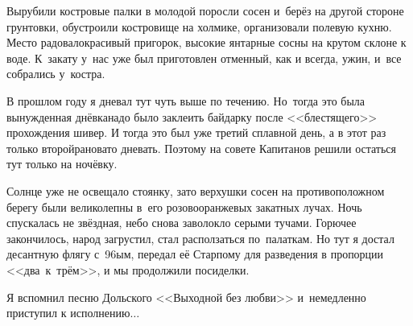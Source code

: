 Вырубили костровые палки в молодой поросли сосен и~берёз на другой стороне грунтовки, обустроили костровище на холмике, организовали полевую кухню. Место радовало\mdash красивый пригорок, высокие янтарные сосны на крутом склоне к воде. К~закату у~нас уже был приготовлен отменный, как и всегда, ужин, и~все собрались у~костра. 

В прошлом году я дневал тут чуть выше по течению. Но~тогда это была вынужденная днёвка\mdash  надо было заклеить байдарку после <<блестящего>> прохождения шивер. И тогда это был уже третий сплавной день, а в этот раз только второй\mdash рановато дневать. Поэтому на совете Капитанов решили остаться тут только на ночёвку.

Солнце уже не освещало стоянку, зато верхушки сосен на противоположном берегу были великолепны в~его розово\sdash оранжевых закатных лучах. Ночь спускалась не звёздная, небо снова заволокло серыми тучами. Горючее закончилось, народ загрустил, стал расползаться по~палаткам. Но тут я достал десантную флягу с~96\sdash ым, передал её Старпому для разведения в пропорции <<два~к~трём>>, и мы продолжили посиделки. 

Я вспомнил песню Дольского <<Выходной без любви>> и~немедленно приступил к исполнению$\ldots$  

